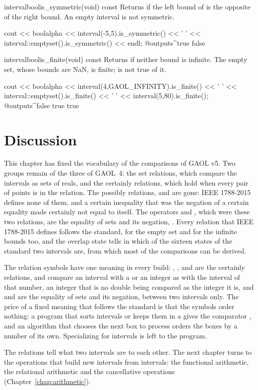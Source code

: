 \begin{defmethod}{interval}{bool}{is\_symmetric}{(void) const}
  Returns  if the left bound of  is the opposite of
  the right bound. An empty interval is not symmetric.

\begin{example}
cout << boolalpha << interval(-5,5).is_symmetric() << ' '
     << interval::emptyset().is_symmetric() << endl;
@outputs^true false~
\end{example}
\end{defmethod}

\begin{defmethod}{interval}{bool}{is\_finite}{(void) const}
  Returns  if neither bound is infinite. The empty set, whose
  bounds are NaN, is finite;  is not true of
  it.

\begin{example}
cout << boolalpha << interval(4,GAOL_INFINITY).is_finite() << ' '
     << interval::emptyset().is_finite() << ' '
     << interval(5,80).is_finite();
@outputs^false true true~
\end{example}
\end{defmethod}

\section{Discussion}

This chapter has fixed the vocabulary of the comparisons of GAOL v5. Two
groups remain of the three of GAOL~4: the set relations, which compare the
intervals as sets of reals, and the certainly relations, which hold when
every pair of points is in the relation. The possibly relations,
 and  are gone: IEEE 1788-2015
defines none of them, and a certain inequality that was the negation of a
certain equality made  certainly not equal to itself. The
operators \code{==} and \code{!=}, which were these two relations, are the
equality of sets and its negation, . Every
relation that IEEE 1788-2015 defines follows the standard, for the empty set
and for the infinite bounds too, and the overlap state tells in which of the
sixteen states of the standard two intervals are, from which most of the
comparisons can be derived.

\medskip
The relation symbols have one meaning in every build: \code{<}, \code{<=},
\code{>} and \code{>=} are the certainly relations, and compare an interval
with a  or an integer as with the interval of that number, an
integer that is no double being compared as the integer it is, and \code{==}
and \code{!=} are the equality of sets and its negation, between two
intervals only. The price of a fixed meaning that follows the
standard is that the symbols order nothing: a program that sorts intervals
or keeps them in a  gives the comparator
, and an algorithm that chooses the next box
to process orders the boxes by a number of its own. Specializing
 for intervals is left to the program.

\medskip
The relations tell what two intervals are to each other. The next chapter
turns to the operations that build new intervals from intervals: the functional
arithmetic, the relational arithmetic and the cancellative operations
(Chapter~\ref{chap:arithmetic}).
